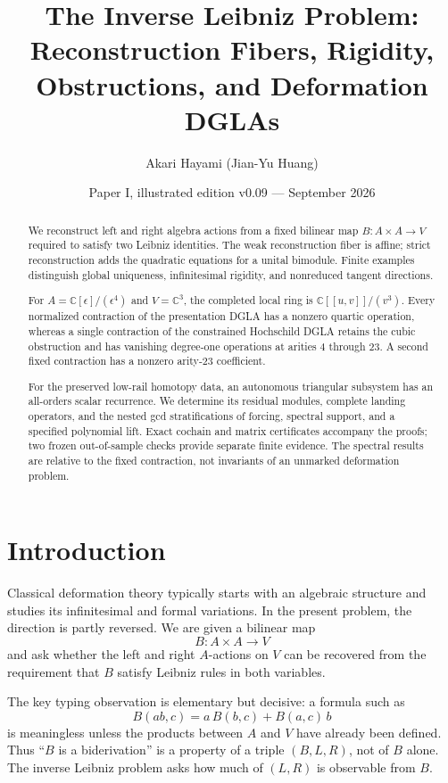 \documentclass[11pt]{amsart}
\title[The Inverse Leibniz Problem]{The Inverse Leibniz Problem:\\Reconstruction Fibers, Rigidity, Obstructions, and Deformation DGLAs}
\author{Akari Hayami (Jian-Yu Huang)}
\date{Paper I, illustrated edition v0.09 --- September 2026}
\newcommand{\C}{\mathbb C}
\begin{document}
\begin{abstract}
We reconstruct left and right algebra actions from a fixed bilinear map
$B:A\times A\to V$ required to satisfy two Leibniz identities.
The weak reconstruction fiber is affine; strict reconstruction adds the
quadratic equations for a unital bimodule. Finite examples distinguish
global uniqueness, infinitesimal rigidity, and nonreduced tangent directions.

For $A=\C[\epsilon]/(\epsilon^4)$ and $V=\C^3$, the completed local ring is
$\C[[u,v]]/(v^3)$. Every normalized contraction of the presentation DGLA
has a nonzero quartic operation, whereas a single contraction of the
constrained Hochschild DGLA retains the cubic obstruction and has
vanishing degree-one operations at arities $4$ through $23$.
A second fixed contraction has a nonzero arity-$23$ coefficient.

For the preserved low-rail homotopy data, an autonomous triangular subsystem
has an all-orders scalar recurrence. We determine its residual modules,
complete landing operators, and the nested gcd stratifications of forcing,
spectral support, and a specified polynomial lift.
Exact cochain and matrix certificates accompany the proofs; two frozen
out-of-sample checks provide separate finite evidence.
The spectral results are relative to the fixed contraction, not invariants
of an unmarked deformation problem.
\end{abstract}

\maketitle
\clearpage
\tableofcontents
\clearpage

\section{Introduction}

Classical deformation theory typically starts with an algebraic structure and studies its infinitesimal and formal variations.  In the present problem, the direction is partly reversed.  We are given a bilinear map
\[
B:A\times A\longrightarrow V
\]
and ask whether the left and right $A$-actions on $V$ can be recovered from the requirement that $B$ satisfy Leibniz rules in both variables.

The key typing observation is elementary but decisive: a formula such as
\[
B(ab,c)=a\,B(b,c)+B(a,c)\,b
\]
is meaningless unless the products between $A$ and $V$ have already been defined.  Thus ``$B$ is a biderivation'' is a property of a triple $(B,L,R)$, not of $B$ alone.  The inverse Leibniz problem asks how much of $(L,R)$ is observable from $B$.
\end{document}
